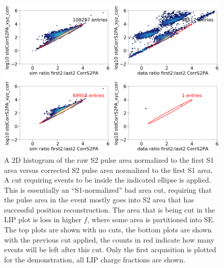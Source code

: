 \begin{figure}[htbp]
\begin{center}
\includegraphics[width=\textwidth]{figures/lips/cut6.png}
\caption{ A 2D histogram of the raw S2 pulse area normalized to the first S1 area versus corrected S2 pulse area normalized to the first S1 area. A cut requiring events to be inside the indicated ellipse is applied. This is essentially an ``S1-normalized'' bad area cut, requiring that the pulse area in the event mostly goes into S2 area that has successful position reconstruction. The area that is being cut in the \acs{LIP} plot is loss in higher $f$, where some area is partitioned into SE. The top plots are shown with no cuts, the bottom plots are shown with the previous cut applied, the counts in red indicate how many events will be left after this cut. Only the first acquisition is plotted for the demonstration, all \acs{LIP} charge fractions are shown. }
\label{fig:cut6}
\end{center}
\end{figure}


